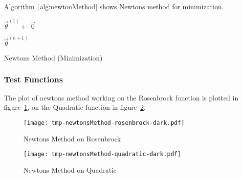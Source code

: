 			Algorithm~\ref{alg:newtonMethod} shows Newtons method for minimization.

			\begin{algorithm}
				\(\vec{\theta}^{(1)} \gets \vec{0}\)


				\Return \(\vec{\theta}^{(n + 1)}\)

				\caption{Newtons Method (Minimization)}
				\label{alg:newtonMethod}
			\end{algorithm}

			\subsubsection{Test Functions}
				The plot of newtons method working on the Rosenbrock function is plotted in figure~\ref{fig:newtonsMethodExampleRosenbrock}, on the Quadratic function in figure~\ref{fig:newtonsMethodExampleQuadratic}.

				\begin{figure}
					\centering
					\texttt{[image: tmp-newtonsMethod-rosenbrock-dark.pdf]}
					\caption{Newtons Method on Rosenbrock}
					\label{fig:newtonsMethodExampleRosenbrock}
				\end{figure}
				\begin{figure}
					\centering
					\texttt{[image: tmp-newtonsMethod-quadratic-dark.pdf]}
					\caption{Newtons Method on Quadratic}
					\label{fig:newtonsMethodExampleQuadratic}
				\end{figure}

